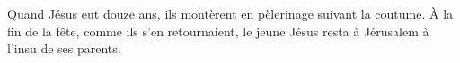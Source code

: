 Quand Jésus eut douze ans, ils montèrent en pèlerinage suivant la coutume.
À la fin de la fête, comme ils s’en retournaient,
	le jeune Jésus resta à Jérusalem à l’insu de ses parents.
